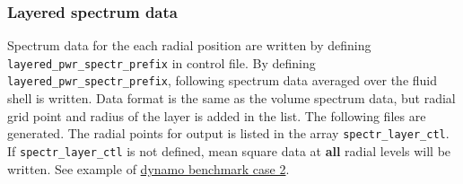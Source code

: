 \subsubsection{Layered spectrum data}
\label{section:layerd_spectr}
Spectrum data for the each radial position are written by defining {\tt layered\_pwr\_spectr\_prefix} in control file. By defining {\tt layered\_pwr\_spectr\_prefix}, following spectrum data averaged over the fluid shell is written. Data format is the same as the volume spectrum data, but radial grid point and radius of the layer is added in the list. The following files are generated. The radial points for output is listed in the array \verb|spectr_layer_ctl|. If \verb|spectr_layer_ctl| is not defined, mean square data at {\bf all} radial levels will be written. See example of \hyperref[section:dynamobench]{dynamo benchmark case 2}.
%
